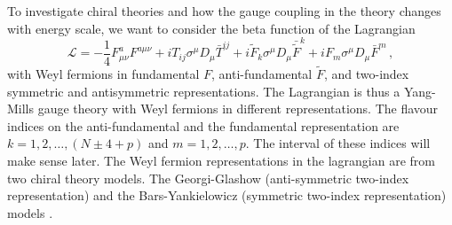 To investigate chiral theories and how the gauge coupling in the theory changes with energy scale, we want to consider the beta function of the Lagrangian 
\begin{equation}
    \mathcal{L}=-\frac{1}{4} F^a_{\mu\nu}F^{a\mu\nu} + iT_{ij}\sigma^\mu D_\mu \bar T^{ij} + i\tilde{F}_k\sigma^\mu D_\mu \bar{\tilde{F}}^k+iF_m \sigma^\mu D_\mu \bar{F}^m\,, \label{eq:lagrangian YM Weyl}
\end{equation}
with Weyl fermions in fundamental $F$, anti-fundamental $\tilde{F}$, and two-index symmetric and antisymmetric representations. The Lagrangian is thus a Yang-Mills gauge theory with Weyl fermions in different representations. The flavour indices on the anti-fundamental and the fundamental representation are $k=1,2,\ldots,(N\pm 4+p)$ and $m=1,2,\ldots,p$. The interval of these indices will make sense later. The Weyl fermion representations in the lagrangian are from two chiral theory models. The Georgi-Glashow (anti-symmetric two-index representation) and the Bars-Yankielowicz (symmetric two-index representation) models \cite{Molgaard:2016bqf}. 

